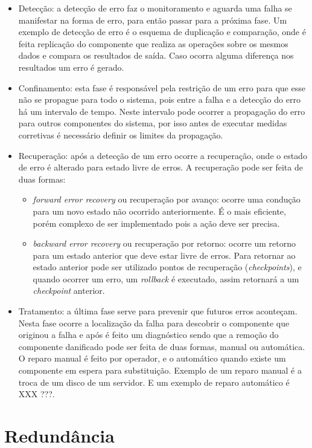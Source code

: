 \begin{itemize}
 \item Detecção: a detecção de erro faz o monitoramento e aguarda uma falha se manifestar na forma de erro, para então
 passar para a próxima fase. Um exemplo de detecção de erro é o esquema de duplicação e comparação, onde é feita replicação do componente
 que realiza as operações sobre os mesmos dados e compara os resultados de saída. Caso ocorra alguma diferença nos resultados um erro é gerado.
 \item Confinamento: esta fase é responsável pela restrição de um erro para que esse não se propague para todo o sistema, pois entre a falha e a
 detecção do erro há um intervalo de tempo. Neste intervalo pode ocorrer a propagação do erro para outros componentes do sistema, por isso 
 antes de executar medidas corretivas é necessário definir os limites da propagação.
 \item Recuperação: após a detecção de um erro ocorre a recuperação, onde o estado de erro é alterado para estado livre de erros. A recuperação
 pode ser feita de duas formas:
 \begin{itemize}
  \item \textit{forward error recovery} ou recuperação por avanço: ocorre uma condução para um novo estado não ocorrido anteriormente. É o mais 
  eficiente, porém complexo de ser implementado pois a ação deve ser precisa.
  \item \textit{backward error recovery} ou recuperação por retorno: ocorre um retorno para um estado anterior que deve estar livre de erros.
  Para retornar ao estado anterior pode ser utilizado pontos de recuperação (\textit{checkpoints}), e quando ocorrer um erro, um \textit{rollback} 
  é executado, assim retornará a um \textit{checkpoint} anterior.
 \end{itemize}
 \item Tratamento: a última fase serve para prevenir que futuros erros aconteçam. Nesta fase ocorre a localização da falha para descobrir o 
 componente que originou a falha e após é feito um diagnóstico sendo que a remoção do componente danificado pode ser feita de duas formas, 
 manual ou automática. O reparo manual é feito por operador, e o automático quando existe um componente em espera para substituição.
 Exemplo de um reparo manual é a troca de um disco de um servidor. E um exemplo de reparo automático é XXX ???.
\end{itemize}

\section{Redundância}
\label{section:redundancia}

